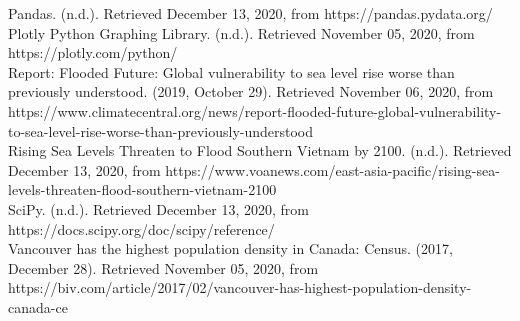 \documentclass[fontsize=11pt]{article}
\begin{document}
\begin{hangparas}{.25in}{1}
        Pandas. (n.d.). Retrieved December 13, 2020, from https://pandas.pydata.org/ \\

        Plotly Python Graphing Library. (n.d.). Retrieved November 05, 2020, from https://plotly.com/python/ \\

        Report: Flooded Future: Global vulnerability to sea level rise worse than previously understood. (2019, October 29). Retrieved November 06, 2020, from https://www.climatecentral.org/news/report-flooded-future-global-vulnerability-to-sea-level-rise-worse-than-previously-understood \\

        Rising Sea Levels Threaten to Flood Southern Vietnam by 2100. (n.d.). Retrieved December 13, 2020, from https://www.voanews.com/east-asia-pacific/rising-sea-levels-threaten-flood-southern-vietnam-2100 \\

        SciPy. (n.d.). Retrieved December 13, 2020, from
        https://docs.scipy.org/doc/scipy/reference/ \\

        Vancouver has the highest population density in Canada: Census. (2017, December 28). Retrieved November 05, 2020, from https://biv.com/article/2017/02/vancouver-has-highest-population-density-canada-ce

    \end{hangparas}
\end{document}
